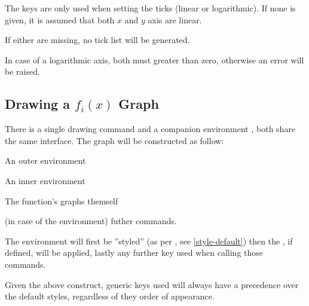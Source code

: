 \documentclass[10pt]{article}
\begin{document}
\begin{tsremark}
The   keys are only used when setting the ticks (linear or logarithmic). If none is given, it is assumed that both $x$ and $y$ axis are linear.
\end{tsremark}
\begin{tsremark}
If either  are missing, no tick list will be generated.
\end{tsremark}

\begin{tsremark}
In case of a logarithmic axis, both  must greater than zero, otherwise an error will be raised.
\end{tsremark}



\subsection{Drawing a $f_i(x)$ Graph}
There is a single drawing command \tsobj{\fxgraphdraw} and a companion environment , both share the same interface. The graph will be constructed as follow: \begin{enumerate*}
                                                           \item An outer  environment
                                                           \item An inner  environment
                                                           \item The function's graphs themself
                                                           \item (in case of the  environment)  futher  commands.
                                                         \end{enumerate*}
The  environment will first be ''styled'' (as per , see \ref{style-default}) then the , if defined, will be applied, lastly any further  key used when calling those commands.
\begin{tsremark}
Given the above construct, generic  keys used will always have a precedence over the default styles, regardless of they order of appearance.
\end{tsremark}
\end{document}
